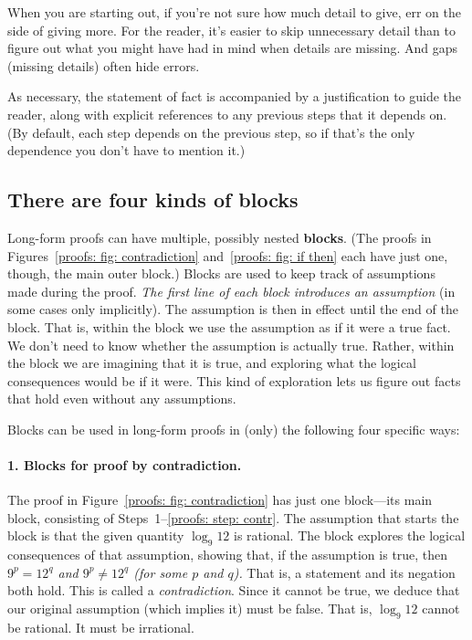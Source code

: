 When you are starting out, if you're not sure how much detail to give, err on the side
of giving more.  For the reader, it's easier to skip unnecessary detail than to figure out what
you might have had in mind when details are missing.  And gaps (missing details)
often hide errors.

As necessary, the statement of fact is accompanied by a justification to guide the reader,
along with explicit references to any previous steps that it depends on.
(By default, each step depends on the previous step,
so if that's the only dependence you don't have to mention it.)

\subsection{There are four kinds of blocks}\label{proofs: sec: blocks}
Long-form proofs can have multiple, possibly nested \textbf{blocks}.
(The proofs in Figures~\ref{proofs: fig: contradiction} and~\ref{proofs: fig: if then} each have just one, though,
the main outer block.)
Blocks are used to keep track of assumptions made during the proof.
\emph{The first line of each block introduces an assumption} (in some cases only implicitly).
The assumption is then in effect until the end of the block.
%
That is, within the block we use the assumption as if it were a true fact.
We don't need to know whether the assumption is actually true.
Rather, within the block we are imagining that it is true,
and exploring what the logical consequences would be if it were.
This kind of exploration lets us figure out facts that hold even without any assumptions.

Blocks can be used in long-form proofs in (only) the following four specific ways:

\paragraph{1. Blocks for proof by contradiction.}
The proof in Figure~\ref{proofs: fig: contradiction} has just one block---its main block, consisting of Steps~1--\ref{proofs: step: contr}.
The assumption that starts the block is that the given quantity $\log_9 12$ is rational.
The block explores the logical consequences of that assumption,
showing that, if the assumption is true,
then \emph{$9^p = 12^q$ and $9^p \ne 12^q$ (for some $p$ and $q$).}
That is, a statement and its negation both hold.
This is called a \emph{contradiction}.
Since it cannot be true, we deduce that our original assumption (which implies it) must be false.
That is, $\log_9 12$ cannot be rational.  It must be irrational.

